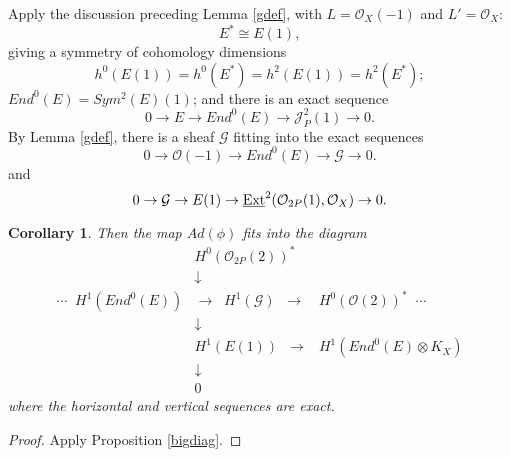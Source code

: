 \documentclass{amsart}
\theoremstyle{plain}
\newtheorem{corollary}[theorem]{Corollary}
\numberwithin{equation}{section}
\begin{document}
Apply the discussion preceding Lemma \ref{gdef}, with
$L={{\mathcal O}} _X(-1)$ and $L'={{\mathcal O}} _X$:
\begin{equation}
\label{dualone}
E^{\ast} \cong E(1),
\end{equation}
giving
a symmetry of cohomology dimensions 
$$
h^0(E(1))= h^0(E^{\ast})= h^2(E(1)) = h^2(E^{\ast});
$$
$End ^0(E) = Sym ^2(E) (1)$; and there is an exact sequence
\begin{equation}
\label{esubseq}
0\rightarrow E \rightarrow End ^0(E) \rightarrow {{\mathcal J}} ^2_P(1) \rightarrow 0.
\end{equation}
By Lemma \ref{gdef}, there is a sheaf ${{\mathcal G}}$ fitting into the exact
sequences
\begin{equation}
\label{gquotseq}
0\rightarrow {{\mathcal O}} (-1)\rightarrow End ^0(E) \rightarrow {{\mathcal G}} \rightarrow 0.
\end{equation}
and
\begin{equation}
\label{gshortseq}
0\rightarrow {{\mathcal G}} \rightarrow E(1) \rightarrow {\underline{{\rm Ext}}} ^2({{\mathcal O}} _{2P}(1),{{\mathcal O}} _X)\rightarrow 0. 
\end{equation}

\begin{corollary}
\label{littlebigdiag}
Then
the map $Ad(\phi )$ fits into the diagram 
$$
\begin{array}{ccc}
& H^0({{\mathcal O}}_{2P}(2))^{\ast} & \\
& \downarrow & \\
\cdots \;\; 
H^1(End ^0(E)) & \longrightarrow \;\; H^1({{\mathcal G}} )\;\;  \longrightarrow & H^0({{\mathcal O}} (2))^{\ast}   \;\; \cdots \\
& \downarrow & \\
&  H^1(E(1)) \;\; \rightarrow  &H^1(End ^0(E)\otimes K_X) \\
& \downarrow & \\
& 0 & 
\end{array}
$$
where the horizontal and vertical sequences are exact.
\end{corollary}
\begin{proof}
Apply Proposition \ref{bigdiag}. 
\end{proof}
\end{document}
